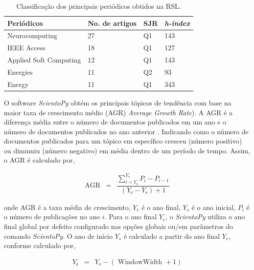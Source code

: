 \begin{table}[!htb]
	\centering
	\caption{Classificação dos principais periódicos obtidos na RSL.}\label{tb2}

\begin{tabular}{llll}		
  \toprule
		Periódicos      & No. de artigos & SJR & \textit{h-index} \\\midrule
		Neurocomputing         & 27                         & Q1                     & 143     \\
		IEEE Access            & 18                         & Q1                     & 127     \\
		Applied Soft Computing & 12                         & Q1                     & 143     \\
		Energies               & 11                         & Q2                     & 93      \\
		Energy                 & 11                         & Q1                     & 343     \\ \bottomrule
	\end{tabular}
\end{table}

O software \textit{ScientoPy} obtém os principais tópicos de tendência com base na maior taxa de crescimento médio (AGR) \textit{Average Growth Rate}). A AGR é a diferença média entre o número de documentos publicados em um ano e o número de documentos publicados no ano anterior \cite{scientopy}. Indicando como o número de documentos publicados para um tópico em específico cresceu (número positivo) ou diminuiu (número negativo) em média dentro de um período de tempo. Assim, o AGR é calculado por,

\begin{eqnarray}
\mathrm{AGR}&=&\dfrac{\sum_{i=Y_{\mathrm{s}}}^{Y_{\mathrm{e}}} P_i-P_{i-1}}{\left(Y_{\mathrm{e}}-Y_{\mathrm{s}}\right)+1} \label{arg}
\end{eqnarray}

\noindent onde AGR é a taxa média de crescimento, $Y_e$ é o ano final, $Y_s$ é o ano inicial, $P_i$ é o número de publicações no ano $i$. Para o ano final $Y_e$, o \textit{ScientoPy} utiliza o ano final global por defeito configurado nas opções globais ou/em parâmetros do comando \textit{ScientoPy}. O ano de início $Y_s$ é calculado a partir do ano final $Y_e$, conforme calculado por,

\begin{eqnarray}
	Y_{\mathrm{s}}&=&Y_{\mathrm{e}}-(\text { WindowWidth }+1)\label{arg2}
\end{eqnarray}

